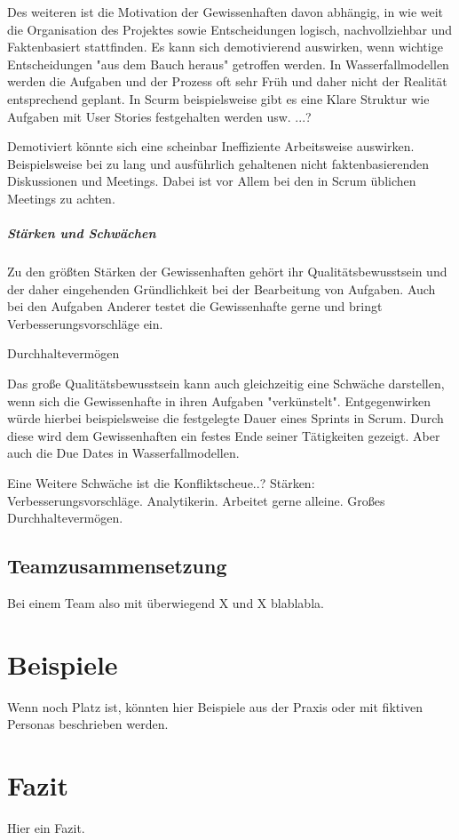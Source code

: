 \documentclass[twocolumn,10pt]{asme2ej}
\begin{document}
Des weiteren ist die Motivation der Gewissenhaften davon abhängig, in wie weit die Organisation des Projektes sowie Entscheidungen logisch, nachvollziehbar und Faktenbasiert stattfinden. Es kann sich demotivierend auswirken, wenn wichtige Entscheidungen "aus dem Bauch heraus" getroffen werden. In Wasserfallmodellen werden die Aufgaben und der Prozess oft sehr Früh und daher nicht der Realität entsprechend geplant. In Scurm beispielsweise gibt es eine Klare Struktur wie Aufgaben mit User Stories festgehalten werden usw. ...?

Demotiviert könnte sich eine scheinbar Ineffiziente Arbeitsweise auswirken. Beispielsweise bei zu lang und ausführlich gehaltenen nicht faktenbasierenden Diskussionen und Meetings. Dabei ist vor Allem bei den in Scrum üblichen Meetings zu achten.

\subparagraph{Stärken und Schwächen}
Zu den größten Stärken der Gewissenhaften gehört ihr Qualitätsbewusstsein und der daher eingehenden Gründlichkeit bei der Bearbeitung von Aufgaben. Auch bei den Aufgaben Anderer testet die Gewissenhafte gerne und bringt Verbesserungsvorschläge ein. 

Durchhaltevermögen

Das große Qualitätsbewusstsein kann auch gleichzeitig eine Schwäche darstellen, wenn sich die Gewissenhafte in ihren Aufgaben "verkünstelt". Entgegenwirken würde hierbei beispielsweise die festgelegte Dauer eines Sprints in Scrum. Durch diese wird dem Gewissenhaften ein festes Ende seiner Tätigkeiten gezeigt. Aber auch die Due Dates in Wasserfallmodellen.

Eine Weitere Schwäche ist die Konfliktscheue..?
Stärken: Verbesserungsvorschläge. Analytikerin. Arbeitet gerne alleine. Großes Durchhaltevermögen.

\cite{disc_pm}
\subsection{Teamzusammensetzung}
Bei einem Team also mit überwiegend X und X blablabla.

\section{Beispiele}
Wenn noch Platz ist, könnten hier Beispiele aus der Praxis oder mit fiktiven Personas beschrieben werden.

\section{Fazit}
Hier ein Fazit.




\end{document}
